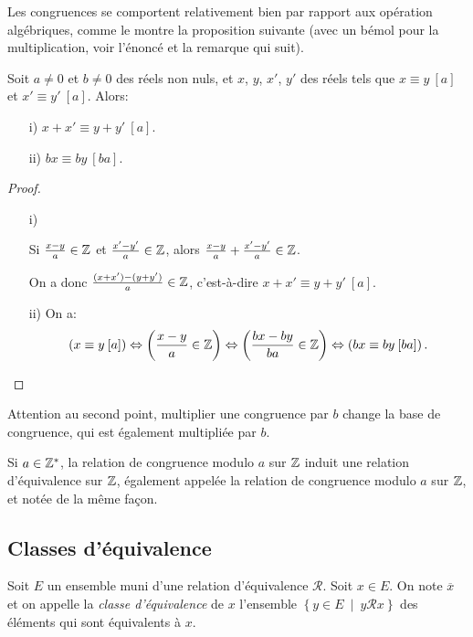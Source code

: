 Les congruences se comportent relativement bien par rapport aux opération algébriques, comme le montre la proposition suivante (avec un bémol pour la multiplication, voir l'énoncé et la remarque qui suit).

\begin{proposition} Soit $a\neq 0$ et $b\neq 0$ des réels non nuls, et $x$, $y$, $x'$, $y'$ des réels tels que $x \equiv y\: [a]$ et $x' \equiv y'\: [a]$. Alors:
\begin{itemize}
\item[i)]{$x+x' \equiv y+y'\: [a]$.}
\item[ii)]{$bx\equiv by \: [ba]$.}
\end{itemize}
\end{proposition}
\begin{proof}
\begin{itemize}
\item[i)]{Si $\frac{x-y}{a} \in \mathbb{Z}$ et $\frac{x'-y'}{a} \in \mathbb{Z}$, alors $\frac{x-y}{a}+\frac{x'-y'}{a} \in \mathbb{Z}$.

On a donc $\frac{(x+x')-(y+y')}{a} \in \mathbb{Z}$, c'est-à-dire $x+x' \equiv y+y'\: [a]$.}
\item[ii)]{On a:
\[\left(x\equiv y \: [a]\right) \Leftrightarrow  \left(\frac{x-y}{a} \in \mathbb{Z}\right) \Leftrightarrow \left(\frac{bx-by}{ba} \in \mathbb{Z}\right) \Leftrightarrow \left(bx\equiv by \: [ba]\right).\]}
\end{itemize}
\end{proof}

\begin{remarque}
Attention au second point, multiplier une congruence par $b$ change la base de congruence, qui est également multipliée par $b$.
\end{remarque}

\begin{definition}
Si $a\in \mathbb{Z}^*$, la relation de congruence modulo $a$ sur $\mathbb{Z}$ induit une relation d'équivalence sur $\mathbb{Z}$, également appelée la relation de congruence modulo $a$ sur $\mathbb{Z}$, et notée de la même façon.
\end{definition}

\subsection{Classes d'équivalence}
\begin{definition}
Soit $E$ un ensemble muni d'une relation d'équivalence ${\mathcal R}$. Soit $x\in E$. On note $\overline{x}$ et on appelle la \emph{classe d'équivalence} de $x$ l'ensemble $\left\{y\in E\:\mid\: y{\mathcal R}x\right\}$ des éléments qui sont équivalents à $x$.
\end{definition}

